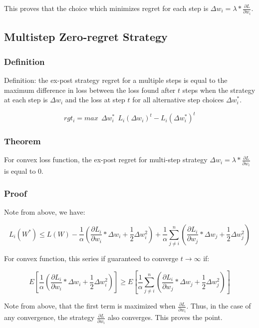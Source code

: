 \documentclass{article}
\begin{document}
This proves that the choice which minimizes regret for each step is $\Delta w_i = \lambda * \frac{\partial L}{\partial w_i}$.

\subsection{Multistep Zero-regret Strategy}

\subsubsection{Definition}

Definition: the ex-post strategy regret for a multiple steps is equal to the maximum difference in loss between the loss found after $t$ steps when the strategy at each step is $\Delta w_i$ and the loss at step $t$ for all alternative step choices $\Delta w_i^*$. 

\[ rgt_i =  max \ \ \Delta w_i^* \ \ L_i(\Delta w_i)^t - L_i(\Delta w_i^*)^t \]


\subsubsection{Theorem}

For convex loss function, the ex-post regret for multi-step strategy $\Delta w_i = \lambda * \frac{\partial L}{\partial w_i}$ is equal to 0.

\subsubsection{Proof}

Note from above, we have:

\[ L_i(W^*) \leq L(W) - \frac{1}{\alpha} (\frac{\partial L_i}{\partial w_i} * \Delta w_i + \frac{1}{2} \Delta w_i^2) + \frac{1}{\alpha} \sum_{j \neq i}^{n} (\frac{\partial L_i}{\partial w_j} * \Delta w_j + \frac{1}{2} \Delta w_j^2)  \]

For convex function, this series if guaranteed to converge $ t \rightarrow \infty$ if:

\[ E[\frac{1}{\alpha} (\frac{\partial L_i}{\partial w_i} * \Delta w_i + \frac{1}{2} \Delta w_i^2)] \geq E[\frac{1}{\alpha} \sum_{j \neq i}^{n} (\frac{\partial L_i}{\partial w_j} * \Delta w_j + \frac{1}{2} \Delta w_j^2)] \]

Note from above, that the first term is maximized when $\frac{\partial L}{\partial w_i}$. Thus, in the case of any convergence, the strategy $\frac{\partial L}{\partial w_i}$ also converges.  This proves the point.
\end{document}
